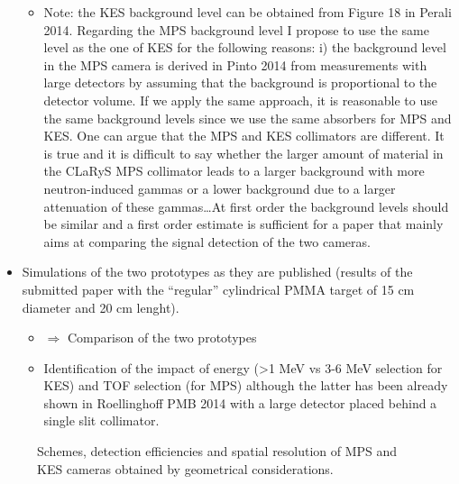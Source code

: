 \documentclass[a4paper,english]{article}
\begin{document}
\begin{itemize}
\begin{itemize}
    \item Note: the KES background level can be obtained from Figure 18 in Perali 2014. Regarding the MPS background level I propose to use the same level as the one of KES for the following reasons: i) the background level in the MPS camera is derived in Pinto 2014 from measurements with large detectors by assuming that the background is proportional to the detector volume. If we apply the same approach, it is reasonable to use the same background levels since we use the same absorbers for MPS and KES. One can argue that the MPS and KES collimators are different. It is true and it is difficult to say whether the larger amount of material in the CLaRyS MPS collimator leads to a larger background with more neutron-induced gammas or a lower background due to a larger attenuation of these gammas\dots At first order the background levels should be similar and a first order estimate is sufficient for a paper that mainly aims at comparing the signal detection of the two cameras.
  \end{itemize}            
  \item Simulations of the two prototypes as they are published (results of the submitted paper with the \enquote{regular} cylindrical PMMA target of 15 cm diameter and 20 cm lenght). 
  \begin{itemize}
    \item $\Rightarrow$ Comparison of the two prototypes
    \item Identification of the impact of energy (>1 MeV vs 3-6 MeV selection for KES) and TOF selection (for MPS) although the latter has been already shown in Roellinghoff PMB 2014 with a large detector placed behind a single slit collimator.
  \end{itemize}        
\end{itemize}

  \begin{figure}[htp]
    \centering
    \quad
    \caption{\label{GeomCons}Schemes, detection efficiencies and spatial resolution of MPS and KES cameras obtained by geometrical considerations.}
  \end{figure}      
\end{document}
